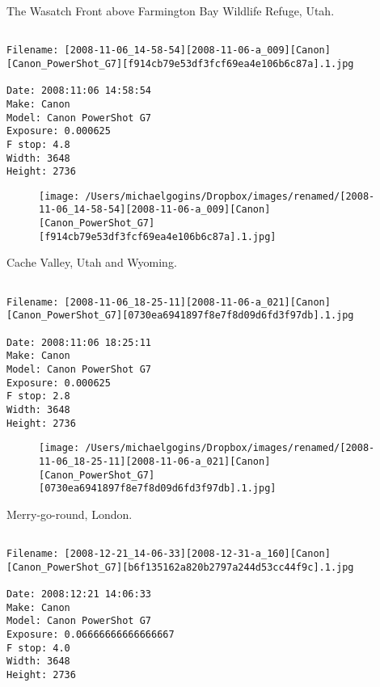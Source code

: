 \clearpage
\onecolumn
\noindent The Wasatch Front above Farmington Bay Wildlife Refuge, Utah.
\noindent
\begin{lstlisting}

Filename: [2008-11-06_14-58-54][2008-11-06-a_009][Canon][Canon_PowerShot_G7][f914cb79e53df3fcf69ea4e106b6c87a].1.jpg

Date: 2008:11:06 14:58:54
Make: Canon
Model: Canon PowerShot G7
Exposure: 0.000625
F stop: 4.8
Width: 3648
Height: 2736
\end{lstlisting}
\clearpage

\begin{figure}
\texttt{[image: /Users/michaelgogins/Dropbox/images/renamed/[2008-11-06\_14-58-54][2008-11-06-a\_009][Canon][Canon\_PowerShot\_G7][f914cb79e53df3fcf69ea4e106b6c87a].1.jpg]}
\end{figure}
    
\clearpage
\onecolumn
\noindent Cache Valley, Utah and Wyoming.
\noindent
\begin{lstlisting}

Filename: [2008-11-06_18-25-11][2008-11-06-a_021][Canon][Canon_PowerShot_G7][0730ea6941897f8e7f8d09d6fd3f97db].1.jpg

Date: 2008:11:06 18:25:11
Make: Canon
Model: Canon PowerShot G7
Exposure: 0.000625
F stop: 2.8
Width: 3648
Height: 2736
\end{lstlisting}
\clearpage

\begin{figure}
\texttt{[image: /Users/michaelgogins/Dropbox/images/renamed/[2008-11-06\_18-25-11][2008-11-06-a\_021][Canon][Canon\_PowerShot\_G7][0730ea6941897f8e7f8d09d6fd3f97db].1.jpg]}
\end{figure}
    
\clearpage
\onecolumn
\noindent Merry-go-round, London.
\noindent
\begin{lstlisting}

Filename: [2008-12-21_14-06-33][2008-12-31-a_160][Canon][Canon_PowerShot_G7][b6f135162a820b2797a244d53cc44f9c].1.jpg

Date: 2008:12:21 14:06:33
Make: Canon
Model: Canon PowerShot G7
Exposure: 0.06666666666666667
F stop: 4.0
Width: 3648
Height: 2736
\end{lstlisting}
\clearpage

